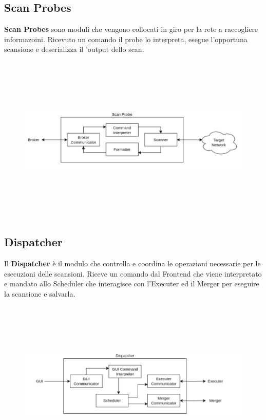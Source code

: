 \documentclass[target=bach,aauheader=,style=]{thud}
\begin{document}
\FloatBarrier

\subsection{Scan Probes}
\textbf{Scan Probes} sono moduli che vengono collocati in giro per la rete a raccogliere informazoini. 
Ricevuto un comando il probe lo interpreta, esegue l'opportuna scansione e deserializza il 'output dello scan.


\begin{figure}[h]
  \includegraphics[width=14cm, height=8cm]{probe}
  \centering
\end{figure}
\FloatBarrier


\subsection{Dispatcher} 
Il \textbf{Dispatcher} è il modulo che controlla e coordina le operazioni necessarie per le esecuzioni delle scansioni.
Riceve un comando dal Frontend che viene interpretato e mandato allo Scheduler che interagisce con l'Executer ed il Merger per eseguire la scansione e salvarla.

\begin{figure}[h]
  \includegraphics[width=14cm, height=8cm]{dispatcher}
  \centering
\end{figure}
\end{document}
